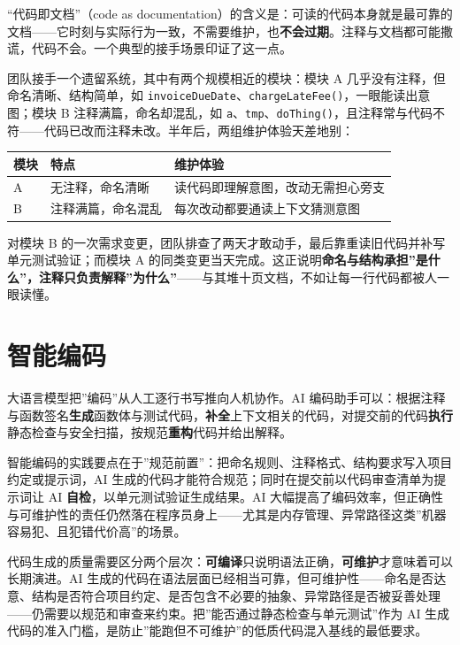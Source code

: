 \documentclass[12pt,a4paper,twoside,openany]{ctexbook}
\numberwithin{figure}{chapter}
\numberwithin{table}{chapter}
\newcounter{none}
\begin{document}
``代码即文档''（code as
documentation）的含义是：可读的代码本身就是最可靠的文档------它时刻与实际行为一致，不需要维护，也\textbf{不会过期}。注释与文档都可能撒谎，代码不会。一个典型的接手场景印证了这一点。

团队接手一个遗留系统，其中有两个规模相近的模块：模块 A
几乎没有注释，但命名清晰、结构简单，如
\texttt{invoiceDueDate}、\texttt{chargeLateFee()}，一眼能读出意图；模块
B 注释满篇，命名却混乱，如
\texttt{a}、\texttt{tmp}、\texttt{doThing()}，且注释常与代码不符------代码已改而注释未改。半年后，两组维护体验天差地别：

{\def\LTcaptype{none} %
\begin{longtable}[]{@{}lll@{}}
\toprule\noalign{}
模块 & 特点 & 维护体验 \\
\midrule\noalign{}
\endhead
\bottomrule\noalign{}
\endlastfoot
A & 无注释，命名清晰 & 读代码即理解意图，改动无需担心旁支 \\
B & 注释满篇，命名混乱 & 每次改动都要通读上下文猜测意图 \\
\end{longtable}
}

对模块 B
的一次需求变更，团队排查了两天才敢动手，最后靠重读旧代码并补写单元测试验证；而模块
A
的同类变更当天完成。这正说明\textbf{命名与结构承担''是什么''，注释只负责解释''为什么''}------与其堆十页文档，不如让每一行代码都被人一眼读懂。

\section{智能编码}\label{ux667aux80fdux7f16ux7801}

大语言模型把''编码''从人工逐行书写推向人机协作。AI
编码助手可以：根据注释与函数签名\textbf{生成}函数体与测试代码，\textbf{补全}上下文相关的代码，对提交前的代码\textbf{执行}静态检查与安全扫描，按规范\textbf{重构}代码并给出解释。

智能编码的实践要点在于''规范前置''：把命名规则、注释格式、结构要求写入项目约定或提示词，AI
生成的代码才能符合规范；同时在提交前以代码审查清单为提示词让 AI
\textbf{自检}，以单元测试验证生成结果。AI
大幅提高了编码效率，但正确性与可维护性的责任仍然落在程序员身上------尤其是内存管理、异常路径这类''机器容易犯、且犯错代价高''的场景。

代码生成的质量需要区分两个层次：\textbf{可编译}只说明语法正确，\textbf{可维护}才意味着可以长期演进。AI
生成的代码在语法层面已经相当可靠，但可维护性------命名是否达意、结构是否符合项目约定、是否包含不必要的抽象、异常路径是否被妥善处理------仍需要以规范和审查来约束。把''能否通过静态检查与单元测试''作为
AI
生成代码的准入门槛，是防止''能跑但不可维护''的低质代码混入基线的最低要求。
\end{document}
